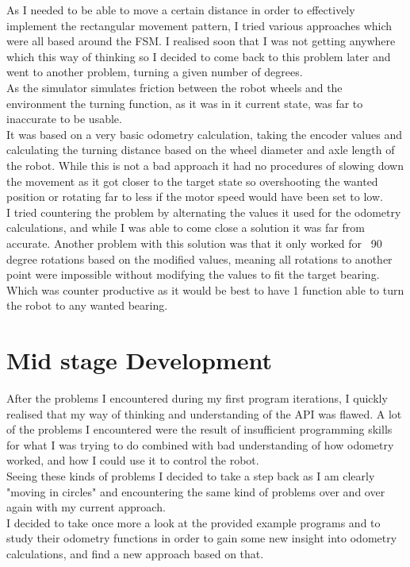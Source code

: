 \documentclass[10pt,a4paper]{article}
\begin{document}
\begin{flushleft}
As I needed to be able to move a certain distance in order to effectively implement the rectangular movement pattern, I tried various approaches which were all based around the FSM. 
I realised soon that I was not getting anywhere which this way of thinking so I decided to come back to this problem later and went to another problem, turning a given number of degrees. \\
As the simulator simulates friction between the robot wheels and the environment the turning function, as it was in it current state, was far to inaccurate to be usable. \\
It was based on a very basic odometry calculation, taking the encoder values and calculating the turning distance based on the wheel diameter and axle length of the robot. While this is not a bad approach it had no procedures of slowing down the movement as it got closer to the target state so overshooting the wanted position or rotating far to less if the motor speed would have been set to low. \\
I tried countering the problem by alternating the values it used for the odometry calculations, and while I was able to come close a solution it was far from accurate. Another problem with this solution was that it only worked for ~90 degree rotations based on the modified values, meaning all rotations to another point were impossible without modifying the values to fit the target bearing. Which was counter productive as it would be best to have 1 function able to turn the robot to any wanted bearing. \\

\section{Mid stage Development}
After the problems I encountered during my first program iterations, I quickly realised that my way of thinking and understanding of the API was flawed. A lot of the problems I encountered were the result of insufficient programming skills for what I was trying to do combined with bad understanding of how odometry worked, and how I could use it to control the robot.\\
Seeing these kinds of problems I decided to take a step back as I am clearly "moving in circles" and encountering the same kind of problems over and over again with my current approach. \\
I decided to take once more a look at the provided example programs and to study their odometry functions in order to gain some new insight into odometry calculations, and find a new approach based on that.


\end{flushleft}
\end{document}
